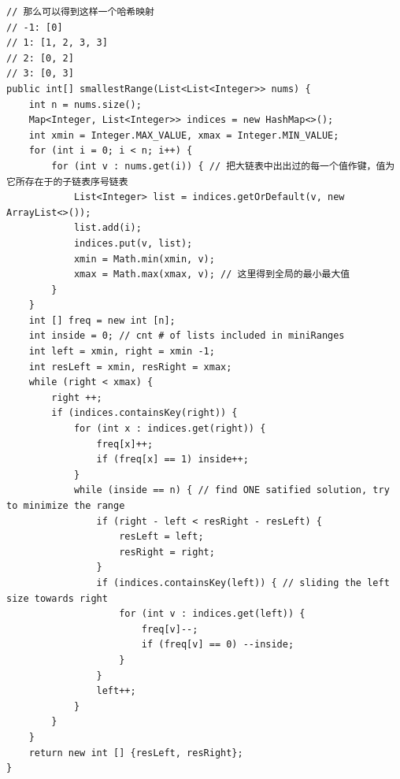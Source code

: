 \documentclass[9pt, b5paaper]{book}
\begin{document}
\begin{verbatim}
// 那么可以得到这样一个哈希映射
// -1: [0]
// 1: [1, 2, 3, 3]
// 2: [0, 2]
// 3: [0, 3]
public int[] smallestRange(List<List<Integer>> nums) {
    int n = nums.size();
    Map<Integer, List<Integer>> indices = new HashMap<>();
    int xmin = Integer.MAX_VALUE, xmax = Integer.MIN_VALUE;
    for (int i = 0; i < n; i++) {
        for (int v : nums.get(i)) { // 把大链表中出出过的每一个值作键，值为它所存在于的子链表序号链表
            List<Integer> list = indices.getOrDefault(v, new ArrayList<>());
            list.add(i);
            indices.put(v, list);
            xmin = Math.min(xmin, v);
            xmax = Math.max(xmax, v); // 这里得到全局的最小最大值
        }
    }
    int [] freq = new int [n];
    int inside = 0; // cnt # of lists included in miniRanges
    int left = xmin, right = xmin -1;
    int resLeft = xmin, resRight = xmax;
    while (right < xmax) {
        right ++;
        if (indices.containsKey(right)) {
            for (int x : indices.get(right)) {
                freq[x]++;
                if (freq[x] == 1) inside++;
            }
            while (inside == n) { // find ONE satified solution, try to minimize the range
                if (right - left < resRight - resLeft) {
                    resLeft = left;
                    resRight = right;
                }
                if (indices.containsKey(left)) { // sliding the left size towards right
                    for (int v : indices.get(left)) {
                        freq[v]--;
                        if (freq[v] == 0) --inside;
                    }
                }
                left++;
            }
        }
    }
    return new int [] {resLeft, resRight};
}
\end{verbatim}
\end{document}
